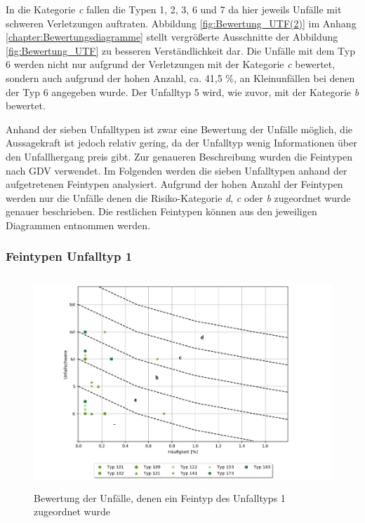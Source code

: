 In die Kategorie \textit{c} fallen die Typen 1, 2, 3, 6 und 7 da hier jeweils Unfälle mit schweren Verletzungen auftraten. Abbildung \ref{fig:Bewertung_UTF(2)} im Anhang \ref{chapter:Bewertungsdiagramme} stellt vergrößerte Ausschnitte der Abbildung \ref{fig:Bewertung_UTF} zu besseren Verständlichkeit dar. Die Unfälle mit dem Typ 6 werden nicht nur aufgrund der Verletzungen mit der Kategorie \textit{c} bewertet, sondern auch aufgrund der hohen Anzahl, ca. 41,5 \%, an Kleinunfällen bei denen der Typ 6 angegeben wurde. Der Unfalltyp 5 wird, wie zuvor, mit der Kategorie \textit{b} bewertet.

Anhand der sieben Unfalltypen ist zwar eine Bewertung der Unfälle möglich, die Aussagekraft ist jedoch relativ gering, da der Unfalltyp wenig Informationen über den Unfallhergang preis gibt. Zur genaueren Beschreibung wurden die Feintypen nach GDV verwendet. Im Folgenden werden die sieben Unfalltypen anhand der aufgetretenen Feintypen analysiert. Aufgrund der hohen Anzahl der Feintypen werden nur die Unfälle denen die Risiko-Kategorie \textit{d}, \textit{c} oder \textit{b} zugeordnet wurde genauer beschrieben. Die restlichen Feintypen können aus den jeweiligen Diagrammen entnommen werden.

\subsubsection{Feintypen Unfalltyp 1}


\begin{savenotes}
	\begin{figure}[H]
		\centering
		\includegraphics[width=12cm,height=8cm]{figures/Bewertung_FT1}
		\caption[Bewertung der Unfälle, denen ein Feintyp des Unfalltyps 1 zugeordnet wurde]{Bewertung der Unfälle, denen ein Feintyp des Unfalltyps 1 zugeordnet wurde}\label{fig:Bewertung_FT1}
	\end{figure}
\end{savenotes}

